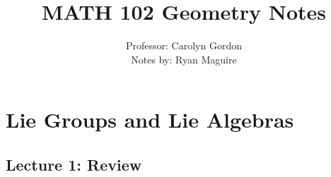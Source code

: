 \documentclass{book}                                                            %
\begin{document}
    \title{MATH 102 Geometry Notes}
    \author{%
        Professor: Carolyn Gordon\\
        Notes by: Ryan Maguire%
    }
    \date{\vspace{-5ex}}
    \maketitle
    \tableofcontents
    \listoffigures
    \chapter{Lie Groups and Lie Algebras}
        \section{Lecture 1: Review}
\end{document}
